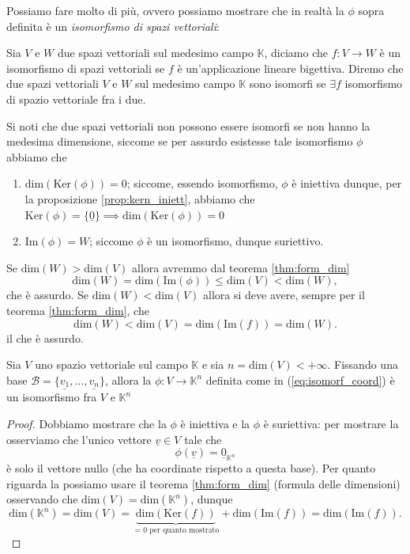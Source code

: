 Possiamo fare molto di più, ovvero possiamo mostrare che in realtà la $\phi$ sopra definita è un \emph{isomorfismo di spazi vettoriali}:
\begin{definition}
  Sia $V$ e $W$ due spazi vettoriali sul medesimo campo $\mathbb{K}$, diciamo che $f: V \to W$ è un isomorfismo di spazi vettoriali se $f$ è un'applicazione lineare bigettiva. Diremo che due spazi vettoriali $V$ e $W$ sul medesimo campo $\mathbb{K}$ sono isomorfi se $\exists f$ isomorfismo di spazio vettoriale fra i due. 
\end{definition}
\begin{remark}
  Si noti che due spazi vettoriali non possono essere isomorfi se non hanno la medesima dimensione, siccome se per assurdo esistesse tale isomorfismo $\phi$ abbiamo che 
  \begin{enumerate}[label=\protect\circled{\arabic*}]
    \item $\text{dim}(\text{Ker}(\phi)) = 0$; siccome, essendo isomorfismo, $\phi$ è iniettiva dunque, per la proposizione \ref{prop:kern_iniett}, abbiamo che $\text{Ker}(\phi) = \{ \underline{0} \} \implies \text{dim}(\text{Ker}(\phi)) = 0$
    \item $\text{Im}(\phi) = W$; siccome $\phi$ è un isomorfismo, dunque suriettivo.
  \end{enumerate}  
  Se $\text{dim}(W) > \text{dim}(V)$ allora avremmo dal teorema \ref{thm:form_dim}
  $$
    \text{dim}(W) = \text{dim}(\text{Im}(\phi)) \leq \text{dim}(V) < \text{dim}(W),
  $$
  che è assurdo. Se $\text{dim}(W) < \text{dim}(V)$ allora si deve avere, sempre per il teorema \ref{thm:form_dim}, che
  $$
    \text{dim}(W) < \text{dim}(V) = \text{dim}(\text{Im}(f)) = \text{dim}(W).
  $$
  il che è assurdo.
\end{remark}
\begin{prop}
  Sia $V$ uno spazio vettoriale sul campo $\mathbb{K}$ e sia $n = \text{dim}(V) < +\infty$. Fissando una base $\mathcal{B} = \{\underline{v_1}, \ldots, \underline{v_n} \}$, allora la $\phi: V \to \mathbb{K}^n$ definita come in (\ref{eq:isomorf_coord}) è un isomorfismo fra $V$ e $\mathbb{K}^n$
\end{prop}
\begin{proof}
  Dobbiamo mostrare che  la $\phi$ è iniettiva e  la $\phi$ è suriettiva: per mostrare la  osserviamo che l'unico vettore $\underline{v} \in V$ tale che
  $$
    \phi(\underline{v}) = \underline{0}_{\mathbb{K}^n}
  $$
  è solo il vettore nullo (che ha coordinate rispetto a questa base). Per quanto riguarda la  possiamo usare il teorema \ref{thm:form_dim} (formula delle dimensioni) osservando che $\text{dim}(V) = \text{dim}(\mathbb{K}^n)$, dunque
  $$
  \text{dim}(\mathbb{K}^n) = \text{dim}(V) = \underbrace{\text{dim}(\text{Ker}(f))}_{= 0\text{ per quanto mostrato}} + \text{dim}(\text{Im}(f)) = \text{dim}(\text{Im}(f)).
  $$
\end{proof}
